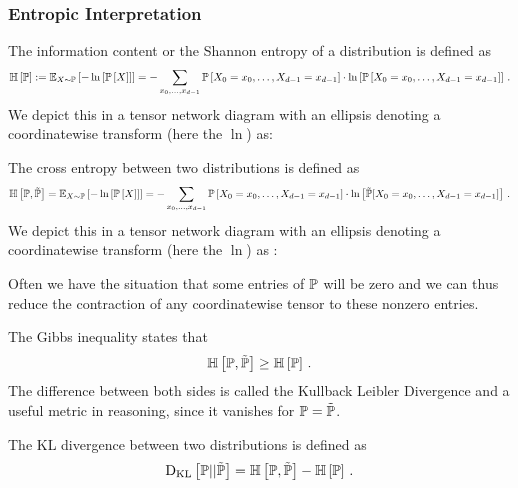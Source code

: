 \subsubsection{Entropic Interpretation}

\begin{definition}
	The information content or the Shannon entropy of a distribution is defined as
		\[ \mathbb{H}\left[\mathbb{P}\right] := \mathbb{E}_{X\sim\mathbb{P}}\left[-\ln \left[ \mathbb{P}\left[X\right] \right]\right] = - \sum_{x_{0},\ldots,x_{d-1}} \mathbb{P}\left[X_{0}=x_{0},\ldots,X_{d-1}=x_{d-1}\right] \cdot \ln \left[ \mathbb{P}\left[X_{0}=x_{0},\ldots,X_{d-1}=x_{d-1}\right] \right] \, . \]
	We depict this in a tensor network diagram with an ellipsis denoting a coordinatewise transform (here the $\ln$) as:
	\begin{center}
		
	\end{center}
\end{definition}


\begin{definition}\label{def:crossEntropy}
	The cross entropy between two distributions is defined as 
		\[ \mathbb{H}\left[\mathbb{P},\tilde{\mathbb{P}}\right] 
		=  \mathbb{E}_{X\sim\mathbb{P}}\left[-\ln \left[ \mathbb{P}\left[X\right] \right]\right] 
		= - \sum_{x_{0},\ldots,x_{d-1}}  \mathbb{P}\left[X_{0}=x_{0},\ldots,X_{d-1}=x_{d-1}\right] \cdot \ln \left[ \tilde{\mathbb{P}}[X_{0}=x_{0},\ldots,X_{d-1}=x_{d-1}] \right]  \, . \]
	We depict this in a tensor network diagram with an ellipsis denoting a coordinatewise transform (here the $\ln$) as :
	\begin{center}
		
	\end{center}
\end{definition}


Often we have the situation that some entries of $\mathbb{P}$ will be zero and we can thus reduce the contraction of any coordinatewise tensor to these nonzero entries. 

The Gibbs inequality states that
		\[ \mathbb{H}\left[\mathbb{P},\tilde{\mathbb{P}}\right] \geq \mathbb{H}\left[\mathbb{P}\right] \, . \]
The difference between both sides is called the Kullback Leibler Divergence and a useful metric in reasoning, since it vanishes for $\mathbb{P}=\tilde{\mathbb{P}}$.

\begin{definition}\label{def:KLDivergence}
	The KL divergence between two distributions is defined as 
		\[ \mathrm{D}_{\mathrm{KL}}\left[ \mathbb{P} || \tilde{\mathbb{P}} \right] = \mathbb{H}\left[\mathbb{P},\tilde{\mathbb{P}}\right] - \mathbb{H}\left[\mathbb{P}\right]  \, . \]
%		
\end{definition}



